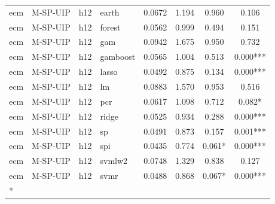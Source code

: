 \begin{ThreePartTable}
\begin{longtable}[t]{llclcccc}
\addlinespace
ecm & M-SP-UIP & h12 & earth & 0.0672 & 1.194 & 0.960 & 0.106\\
ecm & M-SP-UIP & h12 & forest & 0.0562 & 0.999 & 0.494 & 0.151\\
ecm & M-SP-UIP & h12 & gam & 0.0942 & 1.675 & 0.950 & 0.732\\
ecm & M-SP-UIP & h12 & gamboost & 0.0565 & 1.004 & 0.513 & 0.000***\\
ecm & M-SP-UIP & h12 & lasso & 0.0492 & 0.875 & 0.134 & 0.000***\\
ecm & M-SP-UIP & h12 & lm & 0.0883 & 1.570 & 0.953 & 0.516\\
ecm & M-SP-UIP & h12 & pcr & 0.0617 & 1.098 & 0.712 & 0.082*\\
ecm & M-SP-UIP & h12 & ridge & 0.0525 & 0.934 & 0.288 & 0.000***\\
ecm & M-SP-UIP & h12 & sp & 0.0491 & 0.873 & 0.157 & 0.001***\\
ecm & M-SP-UIP & h12 & spi & 0.0435 & 0.774 & 0.061* & 0.000***\\
ecm & M-SP-UIP & h12 & svmlw2 & 0.0748 & 1.329 & 0.838 & 0.127\\
ecm & M-SP-UIP & h12 & svmr & 0.0488 & 0.868 & 0.067* & 0.000***\\*
\end{longtable}
\end{ThreePartTable}
\endgroup{}
